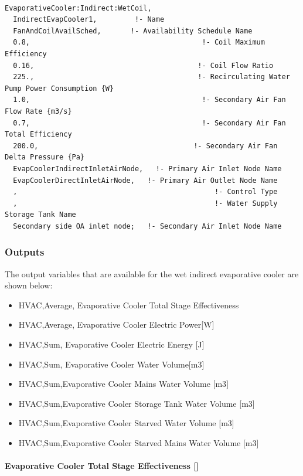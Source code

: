 \begin{lstlisting}

EvaporativeCooler:Indirect:WetCoil,
  IndirectEvapCooler1,         !- Name
  FanAndCoilAvailSched,       !- Availability Schedule Name
  0.8,                                         !- Coil Maximum Efficiency
  0.16,                                       !- Coil Flow Ratio
  225.,                                       !- Recirculating Water Pump Power Consumption {W}
  1.0,                                         !- Secondary Air Fan Flow Rate {m3/s}
  0.7,                                         !- Secondary Air Fan Total Efficiency
  200.0,                                     !- Secondary Air Fan Delta Pressure {Pa}
  EvapCoolerIndirectInletAirNode,   !- Primary Air Inlet Node Name
  EvapCoolerDirectInletAirNode,   !- Primary Air Outlet Node Name
  ,                                               !- Control Type
  ,                                               !- Water Supply Storage Tank Name
  Secondary side OA inlet node;   !- Secondary Air Inlet Node Name
\end{lstlisting}

\subsubsection{Outputs}\label{outputs-3-006}

The output variables that are available for the wet indirect evaporative cooler are shown below:

\begin{itemize}
\item
  HVAC,Average, Evaporative Cooler Total Stage Effectiveness
\item
  HVAC,Average, Evaporative Cooler Electric Power{[}W{]}
\item
  HVAC,Sum, Evaporative Cooler Electric Energy {[}J{]}
\item
  HVAC,Sum, Evaporative Cooler Water Volume{[}m3{]}
\item
  HVAC,Sum,Evaporative Cooler Mains Water Volume {[}m3{]}
\item
  HVAC,Sum,Evaporative Cooler Storage Tank Water Volume {[}m3{]}
\item
  HVAC,Sum,Evaporative Cooler Starved Water Volume {[}m3{]}
\item
  HVAC,Sum,Evaporative Cooler Starved Mains Water Volume {[}m3{]}
\end{itemize}

\paragraph{Evaporative Cooler Total Stage Effectiveness {[]}}\label{evaporative-cooler-total-stage-effectiveness-1}


